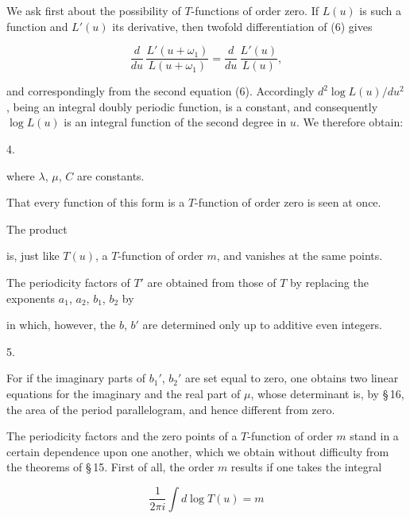 
We ask first about the possibility of $T$-functions of order zero. If $L(u)$ is such a function and $L'(u)$ its derivative, then twofold differentiation of (6) gives

\[
\frac{d}{du}\,\frac{L'(u+\omega_1)}{L(u+\omega_1)} = \frac{d}{du}\,\frac{L'(u)}{L(u)},
\]

and correspondingly from the second equation (6). Accordingly $d^2\log L(u)/du^2$, being an integral doubly periodic function, is a constant, and consequently $\log L(u)$ is an integral function of the second degree in $u$. We therefore obtain:

4. 


where $\lambda$, $\mu$, $C$ are constants.

That every function of this form is a $T$-function of order zero is seen at once.

The product


is, just like $T(u)$, a $T$-function of order $m$, and vanishes at the same points.

The periodicity factors of $T'$ are obtained from those of $T$ by replacing the exponents $a_1$, $a_2$, $b_1$, $b_2$ by


in which, however, the $b$, $b'$ are determined only up to additive even integers.

5. 

For if the imaginary parts of $b_1'$, $b_2'$ are set equal to zero, one obtains two linear equations for the imaginary and the real part of $\mu$, whose determinant is, by \S\,16, the area of the period parallelogram, and hence different from zero.

The periodicity factors and the zero points of a $T$-function of order $m$ stand in a certain dependence upon one another, which we obtain without difficulty from the theorems of \S\,15. First of all, the order $m$ results if one takes the integral

\[
\frac{1}{2\pi i}\int d\log T(u) = m
\]
